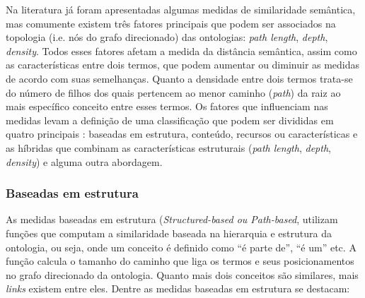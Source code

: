 Na literatura já foram apresentadas algumas medidas de similaridade semântica, mas comumente existem três fatores principais \citep{Slimani2013} que podem ser associados na topologia (i.e. nós do grafo direcionado) das ontologias: \textit{path length}, \textit{depth}, \textit{density}. Todos esses fatores afetam a medida da distância semântica, assim como as características entre dois termos, que podem aumentar ou diminuir as medidas de acordo com suas semelhanças. Quanto a densidade entre dois termos trata-se do número de filhos dos quais pertencem ao menor caminho (\textit{path}) da raiz ao mais específico conceito entre esses termos. Os fatores que influenciam nas medidas levam a definição de uma classificação que podem ser divididas em quatro principais \citep{Slimani2013}: baseadas em estrutura, conteúdo, recursos ou características e as híbridas que combinam as características estruturais (\textit{path length}, \textit{depth}, \textit{density}) e alguma outra abordagem.

\subsubsection{Baseadas em estrutura}

As medidas baseadas em estrutura (\textit{Structured-based ou Path-based}, utilizam funções que computam a similaridade baseada na hierarquia e estrutura da ontologia, ou seja, onde um conceito é definido como “é parte de”, “é um” etc. A função calcula o tamanho do caminho que liga os termos e seus posicionamentos no grafo direcionado da ontologia. Quanto mais dois conceitos são similares, mais \textit{links} existem entre eles. Dentre as medidas baseadas em estrutura se destacam:

